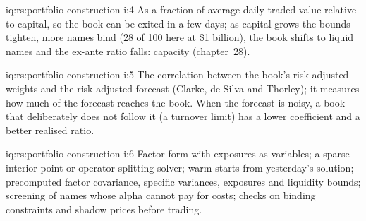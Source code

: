 \begin{solution}{iq:rs:portfolio-construction-i:4}
As a fraction of average daily traded value relative to capital, so the book can be exited in a few days; as capital grows the bounds tighten, more names bind
(28 of 100 here at \$1 billion), the book shifts to liquid names and the ex-ante ratio falls: capacity (chapter~28).
\end{solution}

\begin{solution}{iq:rs:portfolio-construction-i:5}
The correlation between the book's risk-adjusted weights and the risk-adjusted forecast (Clarke, de Silva and Thorley); it measures how much of the forecast reaches
the book. When the forecast is noisy, a book that deliberately does not follow it (a turnover limit) has a lower coefficient and a better realised ratio.
\end{solution}

\begin{solution}{iq:rs:portfolio-construction-i:6}
Factor form with exposures as variables; a sparse interior-point or operator-splitting solver; warm starts from yesterday's solution; precomputed factor
covariance, specific variances, exposures and liquidity bounds; screening of names whose alpha cannot pay for costs; checks on binding constraints and shadow
prices before trading.
\end{solution}
